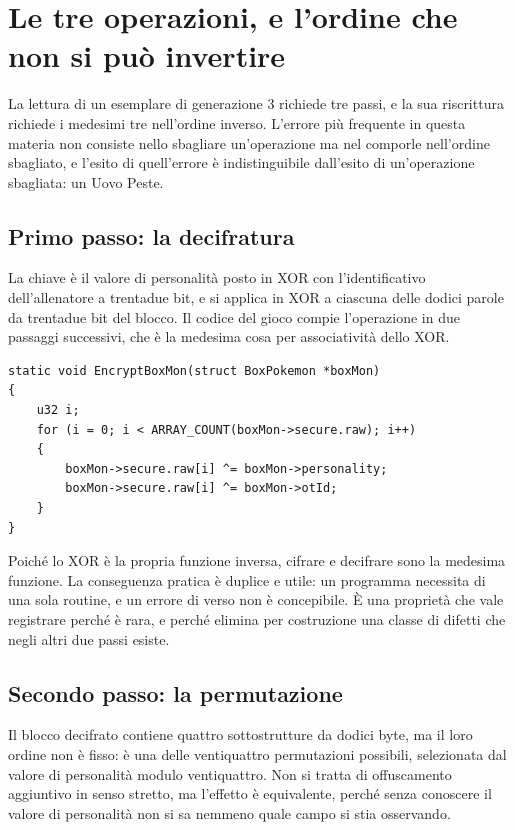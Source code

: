 \section{Le tre operazioni, e l'ordine che non si può invertire}

La lettura di un esemplare di generazione 3 richiede tre passi, e la sua riscrittura richiede i medesimi tre nell'ordine inverso. L'errore più frequente in questa materia non consiste nello sbagliare un'operazione ma nel comporle nell'ordine sbagliato, e l'esito di quell'errore è indistinguibile dall'esito di un'operazione sbagliata: un Uovo Peste.

\subsection{Primo passo: la decifratura}

La chiave è il valore di personalità posto in XOR con l'identificativo dell'allenatore a trentadue bit, e si applica in XOR a ciascuna delle dodici parole da trentadue bit del blocco. Il codice del gioco compie l'operazione in due passaggi successivi, che è la medesima cosa per associatività dello XOR.

\begin{verbatim}
static void EncryptBoxMon(struct BoxPokemon *boxMon)
{
    u32 i;
    for (i = 0; i < ARRAY_COUNT(boxMon->secure.raw); i++)
    {
        boxMon->secure.raw[i] ^= boxMon->personality;
        boxMon->secure.raw[i] ^= boxMon->otId;
    }
}
\end{verbatim}

Poiché lo XOR è la propria funzione inversa, cifrare e decifrare sono la medesima funzione. La conseguenza pratica è duplice e utile: un programma necessita di una sola routine, e un errore di verso non è concepibile. È una proprietà che vale registrare perché è rara, e perché elimina per costruzione una classe di difetti che negli altri due passi esiste.

\subsection{Secondo passo: la permutazione}

Il blocco decifrato contiene quattro sottostrutture da dodici byte, ma il loro ordine non è fisso: è una delle ventiquattro permutazioni possibili, selezionata dal valore di personalità modulo ventiquattro. Non si tratta di offuscamento aggiuntivo in senso stretto, ma l'effetto è equivalente, perché senza conoscere il valore di personalità non si sa nemmeno quale campo si stia osservando.


